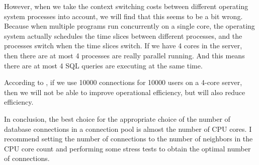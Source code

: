 \documentclass[12pt, a4paper]{article}
\begin{document}
However, when we take the context switching costs between different operating system processes into account, we will find that this seems to be a bit wrong. Because when multiple programs run concurrently on a single core, the operating system actually schedules the time slices between different processes, and the processes switch when the time slices switch. If we have 4 cores in the server, then there are at most 4 processes are really parallel running. And this means there are at most 4 SQL queries are executing at the same time.

According to \cite{pool_sz}, if we use 10000 connections for 10000 users on a 4-core server, then we will not be able to improve operational efficiency, but will also reduce efficiency.

In conclusion, the best choice for the appropriate choice of the number of database connections in a connection pool is almost the number of CPU cores. I recommend setting the number of connections to the number of neighbors in the CPU core count and performing some stress tests to obtain the optimal number of connections.

\end{document}
